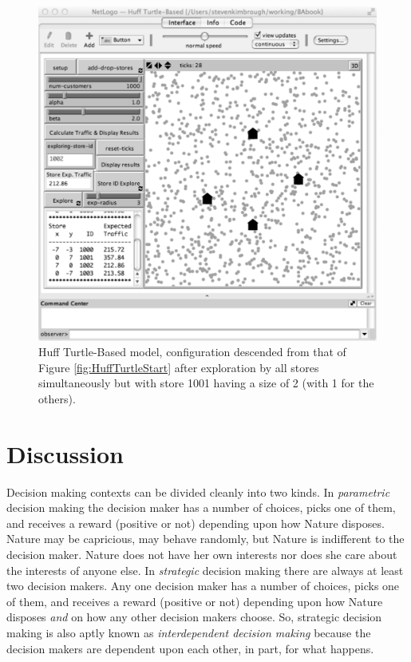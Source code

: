 \begin{figure}[htbp] %
   \centering
   \includegraphics[width=\textwidth]{figures/HuffTurtleAllExplore1001Size2.pdf}  
   \caption{Huff Turtle-Based model, configuration descended from that of Figure \ref{fig:HuffTurtleStart} after exploration by all stores simultaneously but with store 1001 having a size of 2 (with 1 for the others).} %
   \label{fig:HuffTurtleAllExplore1001Size2}
\end{figure}
\newpage\clearpage


\section{Discussion\label{sec:huff_discussion}}

Decision making contexts can be divided cleanly into two kinds. In \emph{parametric} decision making the decision maker has a number of choices, picks one of them, and receives a reward (positive or not) depending upon how Nature disposes.  Nature may be capricious, may behave randomly, but Nature is indifferent to the decision maker. Nature does not have her own interests nor does she care about the interests of anyone else. In \emph{strategic} decision making there are always at least two decision makers. Any one decision maker has a number of choices, picks one of them, and receives a reward (positive or not) depending upon how Nature disposes \emph{and} on how any other decision makers choose. So, strategic decision making is also aptly known as \emph{interdependent decision making} because the decision makers are dependent upon each other, in part, for what happens.

